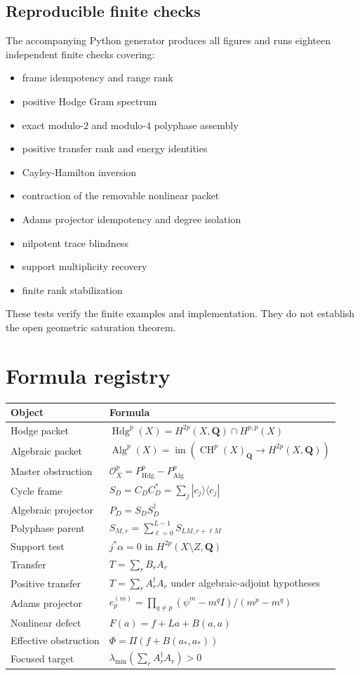 \documentclass[11pt,oneside]{book}
\theoremstyle{definition}
\theoremstyle{remark}
\newcommand{\Hdg}{\operatorname{Hdg}}
\newcommand{\Alg}{\operatorname{Alg}}
\newcommand{\CH}{\operatorname{CH}}
\newcommand{\im}{\operatorname{im}}
\newcommand{\Q}{\mathbf{Q}}
\begin{document}
\section{Reproducible finite checks}
The accompanying Python generator produces all figures and runs eighteen independent finite checks covering:
\begin{itemize}
\item frame idempotency and range rank
\item positive Hodge Gram spectrum
\item exact modulo-$2$ and modulo-$4$ polyphase assembly
\item positive transfer rank and energy identities
\item Cayley-Hamilton inversion
\item contraction of the removable nonlinear packet
\item Adams projector idempotency and degree isolation
\item nilpotent trace blindness
\item support multiplicity recovery
\item finite rank stabilization
\end{itemize}
These tests verify the finite examples and implementation. They do not establish the open geometric saturation theorem.


\appendix
\chapter{Formula registry}
\begin{longtable}{p{}p{}}
\toprule
Object & Formula \\
\midrule
Hodge packet & $\Hdg^p(X)=H^{2p}(X,\Q)\cap H^{p,p}(X)$ \\
Algebraic packet & $\Alg^p(X)=\im(\CH^p(X)_\Q\to H^{2p}(X,\Q))$ \\
Master obstruction & $\mathcal O_X^p=P_{\Hdg}^p-P_{\Alg}^p$ \\
Cycle frame & $S_D=C_DC_D^*=\sum_j|c_j\rangle\langle c_j|$ \\
Algebraic projector & $P_D=S_DS_D^\dagger$ \\
Polyphase parent & $S_{M,r}=\sum_{\ell=0}^{L-1}S_{LM,r+\ell M}$ \\
Support test & $j^*\alpha=0$ in $H^{2p}(X\setminus Z,\Q)$ \\
Transfer & $T=\sum_rB_rA_r$ \\
Positive transfer & $T=\sum_rA_r^\dagger A_r$ under algebraic-adjoint hypotheses \\
Adams projector & $e_p^{(m)}=\prod_{q\ne p}(\psi^m-m^qI)/(m^p-m^q)$ \\
Nonlinear defect & $F(a)=f+La+B(a,a)$ \\
Effective obstruction & $\Phi=\Pi(f+B(a_*,a_*))$ \\
Focused target & $\lambda_{\min}(\sum_rA_r^\dagger A_r)>0$ \\
\bottomrule
\end{longtable}
\end{document}
